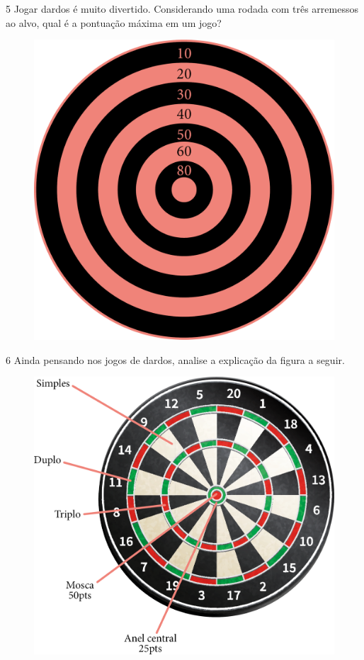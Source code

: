 \num{5} Jogar dardos é muito divertido. Considerando uma rodada com três arremessos ao alvo, qual é a pontuação máxima em um jogo?

\begin{figure}[htpb!]
\centering
\includegraphics[width=.5\textwidth]{./media/image23.png}
\end{figure}

\pagebreak

\num{6} Ainda pensando nos jogos de dardos, analise a explicação da figura a seguir.

\begin{figure}[htpb!]
\centering
\includegraphics[width=.6\textwidth]{./media/image24.png}
\end{figure}


